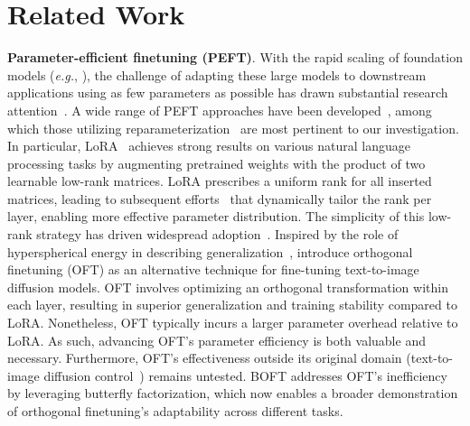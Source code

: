 \section{Related Work}

\textbf{Parameter-efficient finetuning (PEFT)}. With the rapid scaling of foundation models (\emph{e.g.}, \cite{brown2020language,radford2021learning,rombach2022high,kirillov2023segment}), the challenge of adapting these large models to downstream applications using as few parameters as possible has drawn substantial research attention~\cite{treviso2023efficient,ding2023parameter,lialin2023scaling}. A wide range of PEFT approaches have been developed~\cite{houlsby2019parameter,aghajanyan2020intrinsic,hulora2022,edalati2022krona,wang2022adamix,gheini2021cross,zaken2022bitfit,guo2020parameter,sung2021training,ansell2022composable,lester2021power,li2021prefix,vu2022spot,he2021towards,mao2021unipelt,karimi2021compacter,liu2022few,sung2022lst,chen2022parameter,jia2022visual,chen2022adaptformer,zhang2022neural,jie2023fact,lian2022scaling,luo2023towards}, among which those utilizing reparameterization~\cite{aghajanyan2020intrinsic,hulora2022,edalati2022krona} are most pertinent to our investigation. In particular, LoRA~\cite{hulora2022} achieves strong results on various natural language processing tasks by augmenting pretrained weights with the product of two learnable low-rank matrices. LoRA prescribes a uniform rank for all inserted matrices, leading to subsequent efforts~\cite{zhang2022adaptive,valipour2022dylora,zhang2023increlora} that dynamically tailor the rank per layer, enabling more effective parameter distribution. The simplicity of this low-rank strategy has driven widespread adoption~\cite{dettmers2023qlora,zi2023delta,chavan2023one}. Inspired by the role of hyperspherical energy in describing generalization~\cite{liu2018learning,liu2021orthogonal}, \cite{qiu2023controlling} introduce orthogonal finetuning (OFT) as an alternative technique for fine-tuning text-to-image diffusion models. OFT involves optimizing an orthogonal transformation within each layer, resulting in superior generalization and training stability compared to LoRA. Nonetheless, OFT typically incurs a larger parameter overhead relative to LoRA. As such, advancing OFT’s parameter efficiency is both valuable and necessary. Furthermore, OFT’s effectiveness outside its original domain (text-to-image diffusion control~\cite{qiu2023controlling}) remains untested. BOFT addresses OFT's inefficiency by leveraging butterfly factorization, which now enables a broader demonstration of orthogonal finetuning’s adaptability across different tasks.

